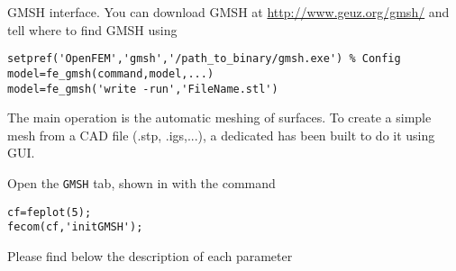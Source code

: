 

GMSH interface. You can download GMSH at \url{http://www.geuz.org/gmsh/} and tell where to find GMSH using

\rsyntax\begin{verbatim}
setpref('OpenFEM','gmsh','/path_to_binary/gmsh.exe') % Config
model=fe_gmsh(command,model,...)
model=fe_gmsh('write -run','FileName.stl')
\end{verbatim}


The main operation is the automatic meshing of surfaces.
To create a simple mesh from a CAD file (.stp, .igs,...), a dedicated  has been built to do it using GUI.

Open the {\tt GMSH} tab, shown in  with the command

\begin{verbatim}
cf=feplot(5);
fecom(cf,'initGMSH');
\end{verbatim}

\begin{figure}[H]
\end{figure}

Please find below the description of each parameter

